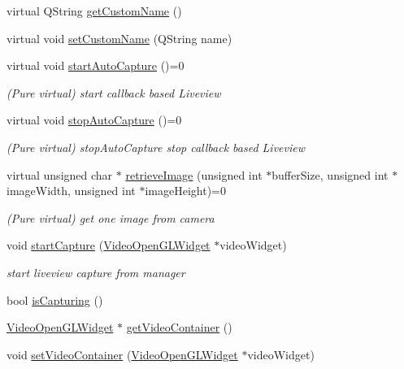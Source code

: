 \begin{DoxyCompactItemize}
\item 
virtual Q\+String \mbox{\hyperlink{class_abstract_camera_acdbe8cb6af440aefa5958c6919ff1ec1}{get\+Custom\+Name}} ()
\item 
virtual void \mbox{\hyperlink{class_abstract_camera_adb6f411fe49721c570128ef51013cf1e}{set\+Custom\+Name}} (Q\+String name)
\item 
virtual void \mbox{\hyperlink{class_abstract_camera_a2f47d9877c5308856f42c94723faca33}{start\+Auto\+Capture}} ()=0
\begin{DoxyCompactList}\small\item\em (Pure virtual) start callback based Liveview \end{DoxyCompactList}\item 
virtual void \mbox{\hyperlink{class_abstract_camera_a08bd5e2c3f8a92187f36e1f6322eccb5}{stop\+Auto\+Capture}} ()=0
\begin{DoxyCompactList}\small\item\em (Pure virtual) stop\+Auto\+Capture stop callback based Liveview \end{DoxyCompactList}\item 
virtual unsigned char $\ast$ \mbox{\hyperlink{class_abstract_camera_a46f1a355c0dbfe5dd66016faefc97eba}{retrieve\+Image}} (unsigned int $\ast$buffer\+Size, unsigned int $\ast$image\+Width, unsigned int $\ast$image\+Height)=0
\begin{DoxyCompactList}\small\item\em (Pure virtual) get one image from camera \end{DoxyCompactList}\item 
void \mbox{\hyperlink{class_abstract_camera_abbbf7accb8254546aace4e2affa2467c}{start\+Capture}} (\mbox{\hyperlink{class_video_open_g_l_widget}{Video\+Open\+G\+L\+Widget}} $\ast$video\+Widget)
\begin{DoxyCompactList}\small\item\em start liveview capture from manager \end{DoxyCompactList}\item 
bool \mbox{\hyperlink{class_abstract_camera_a6a5f894f0e605991aed6c85279efc3a0}{is\+Capturing}} ()
\item 
\mbox{\hyperlink{class_video_open_g_l_widget}{Video\+Open\+G\+L\+Widget}} $\ast$ \mbox{\hyperlink{class_abstract_camera_a0236b61264a6659a05475896ab167da4}{get\+Video\+Container}} ()
\item 
void \mbox{\hyperlink{class_abstract_camera_a5320bb45065833d441811d2273bfce64}{set\+Video\+Container}} (\mbox{\hyperlink{class_video_open_g_l_widget}{Video\+Open\+G\+L\+Widget}} $\ast$video\+Widget)
\end{DoxyCompactItemize}
